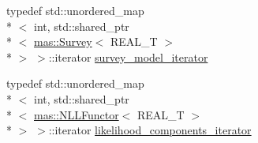 \begin{DoxyCompactItemize}
\item 
typedef std\-::unordered\-\_\-map\\*
$<$ int, std\-::shared\-\_\-ptr\\*
$<$ \hyperlink{structmas_1_1_survey}{mas\-::\-Survey}$<$ R\-E\-A\-L\-\_\-\-T $>$\\*
 $>$ $>$\-::iterator \hyperlink{classmas_1_1_information_ababaa75ccc01c68865bae68aa44453b3}{survey\-\_\-model\-\_\-iterator}
\item 
typedef std\-::unordered\-\_\-map\\*
$<$ int, std\-::shared\-\_\-ptr\\*
$<$ \hyperlink{structmas_1_1_n_l_l_functor}{mas\-::\-N\-L\-L\-Functor}$<$ R\-E\-A\-L\-\_\-\-T $>$\\*
 $>$ $>$\-::iterator \hyperlink{classmas_1_1_information_a566708cde6d1c6f4846f41566c6ee846}{likelihood\-\_\-components\-\_\-iterator}
\end{DoxyCompactItemize}

